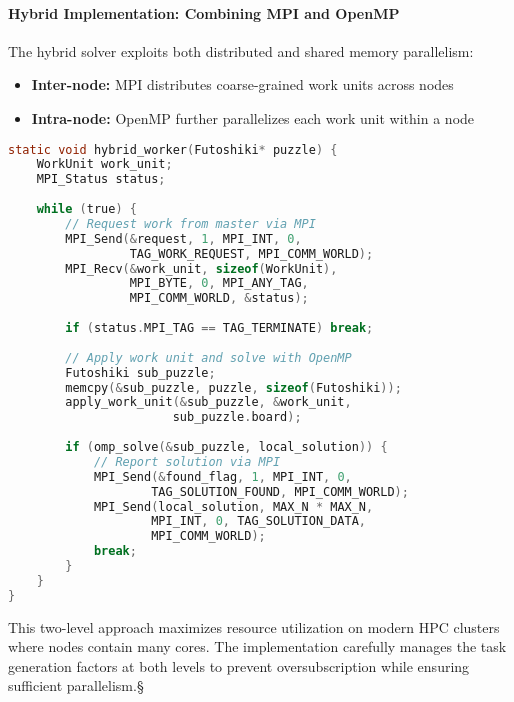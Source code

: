
\paragraph{Hybrid Implementation: Combining MPI and OpenMP}
\label{par:hybrid_implementation}
The hybrid solver exploits both distributed and shared memory parallelism:

\begin{itemize}
    \item \textbf{Inter-node:} MPI distributes coarse-grained work units across nodes
    \item \textbf{Intra-node:} OpenMP further parallelizes each work unit within a node
\end{itemize}

\begin{lstlisting}[language=C, caption=Hybrid worker with nested parallelism]
static void hybrid_worker(Futoshiki* puzzle) {
    WorkUnit work_unit;
    MPI_Status status;
    
    while (true) {
        // Request work from master via MPI
        MPI_Send(&request, 1, MPI_INT, 0, 
                 TAG_WORK_REQUEST, MPI_COMM_WORLD);
        MPI_Recv(&work_unit, sizeof(WorkUnit), 
                 MPI_BYTE, 0, MPI_ANY_TAG, 
                 MPI_COMM_WORLD, &status);
        
        if (status.MPI_TAG == TAG_TERMINATE) break;
        
        // Apply work unit and solve with OpenMP
        Futoshiki sub_puzzle;
        memcpy(&sub_puzzle, puzzle, sizeof(Futoshiki));
        apply_work_unit(&sub_puzzle, &work_unit, 
                       sub_puzzle.board);
        
        if (omp_solve(&sub_puzzle, local_solution)) {
            // Report solution via MPI
            MPI_Send(&found_flag, 1, MPI_INT, 0, 
                    TAG_SOLUTION_FOUND, MPI_COMM_WORLD);
            MPI_Send(local_solution, MAX_N * MAX_N, 
                    MPI_INT, 0, TAG_SOLUTION_DATA, 
                    MPI_COMM_WORLD);
            break;
        }
    }
}
\end{lstlisting}

This two-level approach maximizes resource utilization on modern HPC clusters where nodes contain many cores. The implementation carefully manages the task generation factors at both levels to prevent oversubscription while ensuring sufficient parallelism.§